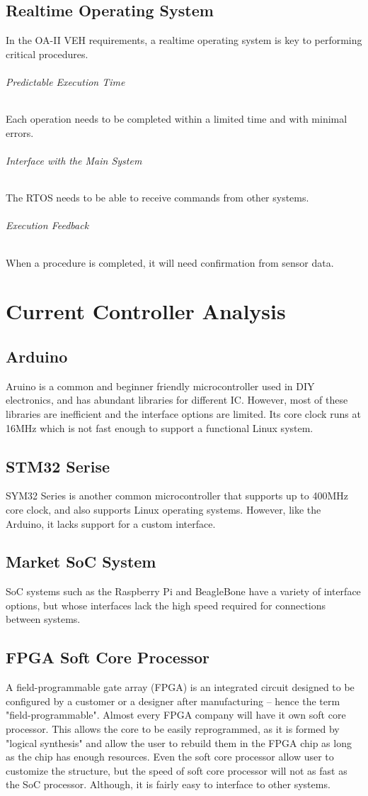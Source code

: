 \documentclass[12pt,article]{memoir}
\begin{document}
\section{Realtime Operating System}
In the OA-II VEH requirements, a realtime operating system is key to performing critical procedures.
\subparagraph{Predictable Execution Time}Each operation needs to be completed within a limited time and with minimal errors.
\subparagraph{Interface with the Main System}The RTOS needs to be able to receive commands from other systems.
\subparagraph{Execution Feedback}When a procedure is completed, it will need confirmation from sensor data.
\newpage
\chapter{Current Controller Analysis}
\section{Arduino}
Aruino is a common and beginner friendly microcontroller used in DIY electronics, and has abundant libraries for different IC. However, most of these libraries are inefficient and the interface options are limited. Its core clock runs at 16MHz which is not fast enough to support a functional Linux system.
\section{STM32 Serise}
SYM32 Series is another common microcontroller that supports up to 400MHz core clock, and also supports Linux operating systems. However, like the Arduino, it lacks support for a custom interface.
\section{Market SoC System}
SoC systems such as the Raspberry Pi and BeagleBone have a variety of interface options, but whose interfaces lack the high speed required for connections between systems.
\section{FPGA Soft Core Processor}
A field-programmable gate array (FPGA) is an integrated circuit designed to be configured by a customer or a designer after manufacturing – hence the term "field-programmable".\cite{Cite Needed} Almost every FPGA company will have it own soft core processor. This allows the core to be easily reprogrammed, as it is formed by "logical synthesis" and allow the user to rebuild them in the FPGA chip as long as the chip has enough resources. Even the soft core processor allow user to customize the structure, but the speed of soft core processor will not as fast as the SoC processor. Although, it is fairly easy to interface to other systems.
\end{document}
